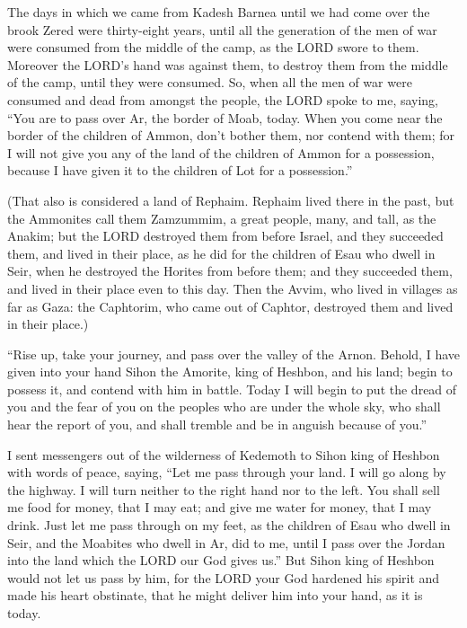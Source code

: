  The days in which we came from Kadesh Barnea until we had
come over the brook Zered were thirty-eight years, until all the
generation of the men of war were consumed from the middle of the camp,
as the LORD swore to them.  Moreover the LORD's hand was
against them, to destroy them from the middle of the camp, until they
were consumed.  So, when all the men of war were consumed
and dead from amongst the people,  the LORD spoke to me,
saying,  ``You are to pass over Ar, the border of Moab,
today.  When you come near the border of the children of
Ammon, don't bother them, nor contend with them; for I will not give you
any of the land of the children of Ammon for a possession, because I
have given it to the children of Lot for a possession.''

 (That also is considered a land of Rephaim. Rephaim lived
there in the past, but the Ammonites call them Zamzummim, 
a great people, many, and tall, as the Anakim; but the LORD destroyed
them from before Israel, and they succeeded them, and lived in their
place,  as he did for the children of Esau who dwell in
Seir, when he destroyed the Horites from before them; and they succeeded
them, and lived in their place even to this day.  Then the
Avvim, who lived in villages as far as Gaza: the Caphtorim, who came out
of Caphtor, destroyed them and lived in their place.)

 ``Rise up, take your journey, and pass over the valley of
the Arnon. Behold, I have given into your hand Sihon the Amorite, king
of Heshbon, and his land; begin to possess it, and contend with him in
battle.  Today I will begin to put the dread of you and the
fear of you on the peoples who are under the whole sky, who shall hear
the report of you, and shall tremble and be in anguish because of you.''

 I sent messengers out of the wilderness of Kedemoth to
Sihon king of Heshbon with words of peace, saying,  ``Let
me pass through your land. I will go along by the highway. I will turn
neither to the right hand nor to the left.  You shall sell
me food for money, that I may eat; and give me water for money, that I
may drink. Just let me pass through on my feet,  as the
children of Esau who dwell in Seir, and the Moabites who dwell in Ar,
did to me, until I pass over the Jordan into the land which the LORD our
God gives us.''  But Sihon king of Heshbon would not let us
pass by him, for the LORD your God hardened his spirit and made his
heart obstinate, that he might deliver him into your hand, as it is
today.

